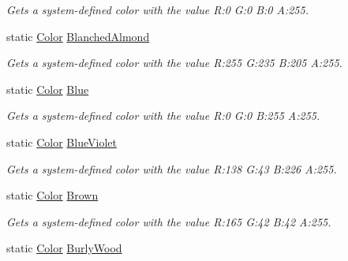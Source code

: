 \begin{DoxyCompactItemize}
\begin{DoxyCompactList}\small\item\em Gets a system-\/defined color with the value R\+:0 G\+:0 B\+:0 A\+:255.\end{DoxyCompactList}\item 
static \hyperlink{structMicrosoft_1_1Xna_1_1Framework_1_1Color}{Color} \hyperlink{structMicrosoft_1_1Xna_1_1Framework_1_1Color_a605c9878e0f8b2f5f510c993b7b249f7}{Blanched\+Almond}
\begin{DoxyCompactList}\small\item\em Gets a system-\/defined color with the value R\+:255 G\+:235 B\+:205 A\+:255.\end{DoxyCompactList}\item 
static \hyperlink{structMicrosoft_1_1Xna_1_1Framework_1_1Color}{Color} \hyperlink{structMicrosoft_1_1Xna_1_1Framework_1_1Color_aadbb3342531fbefd6e7ae00143f743eb}{Blue}
\begin{DoxyCompactList}\small\item\em Gets a system-\/defined color with the value R\+:0 G\+:0 B\+:255 A\+:255.\end{DoxyCompactList}\item 
static \hyperlink{structMicrosoft_1_1Xna_1_1Framework_1_1Color}{Color} \hyperlink{structMicrosoft_1_1Xna_1_1Framework_1_1Color_a7b411efb5c5ec2f2660ba2d5cda346db}{Blue\+Violet}
\begin{DoxyCompactList}\small\item\em Gets a system-\/defined color with the value R\+:138 G\+:43 B\+:226 A\+:255.\end{DoxyCompactList}\item 
static \hyperlink{structMicrosoft_1_1Xna_1_1Framework_1_1Color}{Color} \hyperlink{structMicrosoft_1_1Xna_1_1Framework_1_1Color_ad8b56c943b8231708ed7090575586d39}{Brown}
\begin{DoxyCompactList}\small\item\em Gets a system-\/defined color with the value R\+:165 G\+:42 B\+:42 A\+:255.\end{DoxyCompactList}\item 
static \hyperlink{structMicrosoft_1_1Xna_1_1Framework_1_1Color}{Color} \hyperlink{structMicrosoft_1_1Xna_1_1Framework_1_1Color_a74f360bf9e9fc4e425ba3e357d2391e8}{Burly\+Wood}

\end{DoxyCompactItemize}
